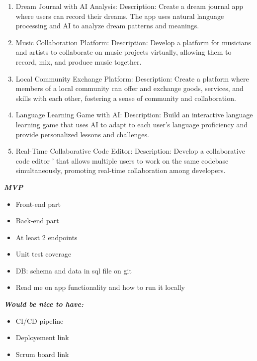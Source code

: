 \documentclass[a4paper,12pt]{article}
\begin{document}
\begin{large}
\begin{enumerate}
\item Dream Journal with AI Analysis: Description: Create a dream journal app where users can record their dreams. The app uses natural language processing and AI to analyze dream patterns and meanings.

\item Music Collaboration Platform: Description: Develop a platform for musicians and artists to collaborate on music projects virtually, allowing them to record, mix, and produce music together.

\item Local Community Exchange Platform: Description: Create a platform where members of a local community can offer and exchange goods, services, and skills with each other, fostering a sense of community and collaboration.

\item Language Learning Game with AI: Description: Build an interactive language learning game that uses AI to adapt to each user's language proficiency and provide personalized lessons and challenges.

\item Real-Time Collaborative Code Editor: Description: Develop a collaborative code editor ' that allows multiple users to work on the same codebase simultaneously, promoting real-time collaboration among developers.

\end{enumerate}


\textit{\textbf{MVP}}

\begin{itemize}
\item Front-end part

\item Back-end part

\item At least 2 endpoints

\item Unit test coverage

\item DB: schema and data in sql file on git

\item Read me on app functionality and how to run it locally

\end{itemize}



\textit{\textbf{Would be nice to have:}}

\begin{itemize}
\item CI/CD pipeline

\item Deployement link

\item Scrum board link

\end{itemize}

\end{large}
\end{document}
